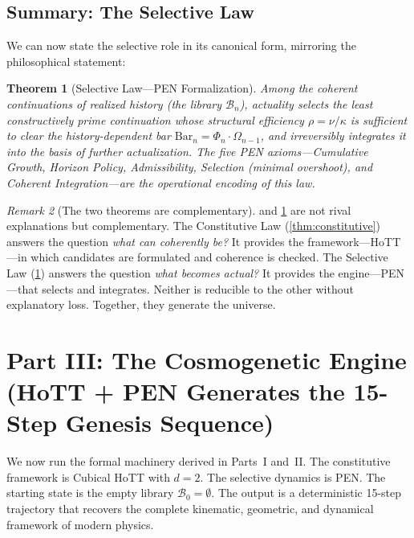 \documentclass[11pt,a4paper]{article}
\theoremstyle{plain}
\newtheorem{theorem}{Theorem}[section]
\theoremstyle{definition}
\theoremstyle{remark}
\newtheorem{remark}[theorem]{Remark}
\newcommand{\B}{\mathcal{B}}
\begin{document}
\subsection{Summary: The Selective Law}

We can now state the selective role in its canonical form, mirroring the philosophical statement:

\begin{theorem}[Selective Law---PEN Formalization]
\label{thm:selective}
Among the coherent continuations of realized history (the library $\B_n$), actuality selects the least constructively prime continuation whose structural efficiency $\rho = \nu/\kappa$ is sufficient to clear the history-dependent bar $\mathrm{Bar}_n = \Phi_n \cdot \Omega_{n-1}$, and irreversibly integrates it into the basis of further actualization.  The five PEN axioms---Cumulative Growth, Horizon Policy, Admissibility, Selection (minimal overshoot), and Coherent Integration---are the operational encoding of this law.
\end{theorem}

\begin{remark}[The two theorems are complementary]
 and \cref{thm:selective} are not rival explanations but complementary.  The Constitutive Law (\cref{thm:constitutive}) answers the question \emph{what can coherently be?}  It provides the framework---HoTT---in which candidates are formulated and coherence is checked.  The Selective Law (\cref{thm:selective}) answers the question \emph{what becomes actual?}  It provides the engine---PEN---that selects and integrates.  Neither is reducible to the other without explanatory loss.  Together, they generate the universe.
\end{remark}


\section{Part III: The Cosmogenetic Engine (HoTT + PEN Generates the 15-Step Genesis Sequence)}
\label{sec:partIII}

We now run the formal machinery derived in Parts~I and~II.  The constitutive framework is Cubical HoTT with $d = 2$.  The selective dynamics is PEN.  The starting state is the empty library $\B_0 = \emptyset$.  The output is a deterministic 15-step trajectory that recovers the complete kinematic, geometric, and dynamical framework of modern physics.
\end{document}
